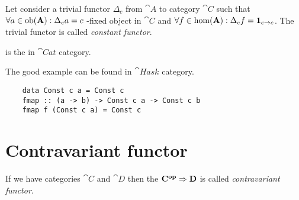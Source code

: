 \begin{definition}
  \label{def:const_functor}
  Let consider a trivial functor $\Delta_c$ from 
  $\cat{A}$ to category $\cat{C}$ such that $\forall a \in \mathrm{ob}(\mathbf{A}):
  \Delta_c a = c$ -fixed object in $\cat{C}$ and 
  $\forall f \in \mathrm{hom}(\mathbf{A}): \Delta_c f = \mathbf{1}_{ c \to c }$. The trivial
  functor is called \textit{constant functor}.
\end{definition}

\begin{example}
  \label{ex:terminal_object_cat}
   is the 
  in $\cat{Cat}$ category.
\end{example}

The good example can be found in $\cat{Hask}$ category.
\begin{example}
  \label{ex:const_functor_hask}
  \begin{verbatim}
    data Const c a = Const c
    fmap :: (a -> b) -> Const c a -> Const c b
    fmap f (Const c a) = Const c
  \end{verbatim}
\end{example}

\section{Contravariant functor}
\begin{definition}
  \label{def:contravariant_functor}
  If we have categories $\cat{C}$ and $\cat{D}$ then the
   $\mathbf{C^{op}} \Rightarrow \mathbf{D}$ is called
  \textit{contravariant functor}. 
\end{definition}


